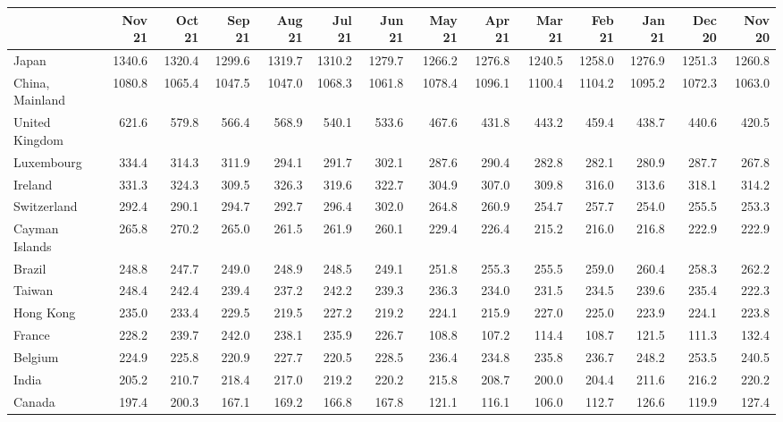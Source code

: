 \documentclass{article}
\begin{document}
    \begin{table}[H]
      \begin{tabular}{lrrrrrrrrrrrrr}
      \hline
      & Nov 21 & Oct 21 & Sep 21 & Aug 21 & Jul 21 & Jun 21 & May 21 & Apr 21 & Mar 21 & Feb 21 & Jan 21 & Dec 20 & Nov 20 \\
      \hline
      Japan & 1340.6 & 1320.4 & 1299.6 & 1319.7 & 1310.2 & 1279.7 & 1266.2 & 1276.8 & 1240.5 & 1258.0 & 1276.9 & 1251.3 & 1260.8 \\
      China, Mainland & 1080.8 & 1065.4 & 1047.5 & 1047.0 & 1068.3 & 1061.8 & 1078.4 & 1096.1 & 1100.4 & 1104.2 & 1095.2 & 1072.3 & 1063.0 \\
      United Kingdom & 621.6 & 579.8 & 566.4 & 568.9 & 540.1 & 533.6 & 467.6 & 431.8 & 443.2 & 459.4 & 438.7 & 440.6 & 420.5 \\
      Luxembourg & 334.4 & 314.3 & 311.9 & 294.1 & 291.7 & 302.1 & 287.6 & 290.4 & 282.8 & 282.1 & 280.9 & 287.7 & 267.8 \\
      Ireland & 331.3 & 324.3 & 309.5 & 326.3 & 319.6 & 322.7 & 304.9 & 307.0 & 309.8 & 316.0 & 313.6 & 318.1 & 314.2 \\
      Switzerland & 292.4 & 290.1 & 294.7 & 292.7 & 296.4 & 302.0 & 264.8 & 260.9 & 254.7 & 257.7 & 254.0 & 255.5 & 253.3 \\
      Cayman Islands & 265.8 & 270.2 & 265.0 & 261.5 & 261.9 & 260.1 & 229.4 & 226.4 & 215.2 & 216.0 & 216.8 & 222.9 & 222.9 \\
      Brazil & 248.8 & 247.7 & 249.0 & 248.9 & 248.5 & 249.1 & 251.8 & 255.3 & 255.5 & 259.0 & 260.4 & 258.3 & 262.2 \\
      Taiwan & 248.4 & 242.4 & 239.4 & 237.2 & 242.2 & 239.3 & 236.3 & 234.0 & 231.5 & 234.5 & 239.6 & 235.4 & 222.3 \\
      Hong Kong & 235.0 & 233.4 & 229.5 & 219.5 & 227.2 & 219.2 & 224.1 & 215.9 & 227.0 & 225.0 & 223.9 & 224.1 & 223.8 \\
      France & 228.2 & 239.7 & 242.0 & 238.1 & 235.9 & 226.7 & 108.8 & 107.2 & 114.4 & 108.7 & 121.5 & 111.3 & 132.4 \\
      Belgium & 224.9 & 225.8 & 220.9 & 227.7 & 220.5 & 228.5 & 236.4 & 234.8 & 235.8 & 236.7 & 248.2 & 253.5 & 240.5 \\
      India & 205.2 & 210.7 & 218.4 & 217.0 & 219.2 & 220.2 & 215.8 & 208.7 & 200.0 & 204.4 & 211.6 & 216.2 & 220.2 \\
      Canada & 197.4 & 200.3 & 167.1 & 169.2 & 166.8 & 167.8 & 121.1 & 116.1 & 106.0 & 112.7 & 126.6 & 119.9 & 127.4 \\

\end{tabular}
\end{table}
\end{document}
